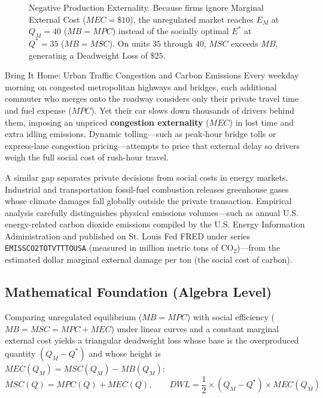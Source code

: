 \documentclass[11pt,letterpaper]{article}
\begin{document}
\begin{figure}[htbp]
\caption{Negative Production Externality. Because firms ignore Marginal External Cost ($MEC = \$10$), the unregulated market reaches $E_M$ at $Q_M = 40$ ($MB = MPC$) instead of the socially optimal $E^*$ at $Q^* = 35$ ($MB = MSC$). On units $35$ through $40$, $MSC$ exceeds $MB$, generating a Deadweight Loss of $\$25$.}
\label{fig:negative_externality}
\end{figure}

\begin{examplecase}{Bring It Home: Urban Traffic Congestion and Carbon Emissions}
Every weekday morning on congested metropolitan highways and bridges, each additional commuter who merges onto the roadway considers only their private travel time and fuel expense ($MPC$). Yet their car slows down thousands of drivers behind them, imposing an unpriced \textbf{congestion externality} ($MEC$) in lost time and extra idling emissions. Dynamic tolling—such as peak-hour bridge tolls or express-lane congestion pricing—attempts to price that external delay so drivers weigh the full social cost of rush-hour travel.

A similar gap separates private decisions from social costs in energy markets. Industrial and transportation fossil-fuel combustion releases greenhouse gases whose climate damages fall globally outside the private transaction. Empirical analysis carefully distinguishes physical emissions volumes—such as annual U.S. energy-related carbon dioxide emissions compiled by the U.S. Energy Information Administration and published on St. Louis Fed FRED under series \texttt{EMISSCO2TOTVTTTOUSA} (measured in million metric tons of $\text{CO}_2$)—from the estimated dollar marginal external damage per ton (the social cost of carbon).
\end{examplecase}

\subsection*{Mathematical Foundation (Algebra Level)}
Comparing unregulated equilibrium ($MB = MPC$) with social efficiency ($MB = MSC = MPC + MEC$) under linear curves and a constant marginal external cost yields a triangular deadweight loss whose base is the overproduced quantity $(Q_M - Q^*)$ and whose height is $MEC(Q_M) = MSC(Q_M) - MB(Q_M)$:
\begin{equation}
MSC(Q) = MPC(Q) + MEC(Q), \qquad DWL = \frac{1}{2} \times (Q_M - Q^*) \times MEC(Q_M)
\end{equation}
\end{document}

